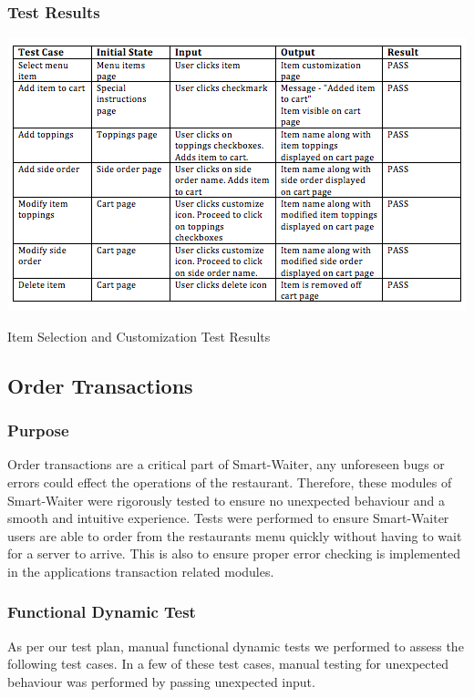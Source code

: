 \documentclass[12pt, titlepage]{article}
\begin{document}
\subsubsection{Test Results}
\break
\begin{table}[h]
\includegraphics[width=\textwidth,height=\textheight,keepaspectratio]{itemselection.png}
  \caption{Item Selection and Customization Test Results}
\end{table}


\subsection{Order Transactions}

\subsubsection{Purpose}
Order transactions are a critical part of Smart-Waiter, any unforeseen bugs or errors could effect the operations of the restaurant. Therefore, these modules of Smart-Waiter were rigorously tested to ensure no unexpected behaviour and a smooth and intuitive experience. Tests were performed to ensure Smart-Waiter users are able to order from the restaurants menu quickly without having to wait for a server to arrive. This is also to ensure proper error checking is implemented in the applications transaction related modules.

\subsubsection{Functional Dynamic Test}
As per our test plan, manual functional dynamic tests we performed to assess the following test cases. In a few of these test cases, manual testing for unexpected behaviour was performed by passing unexpected input.  
\end{document}
